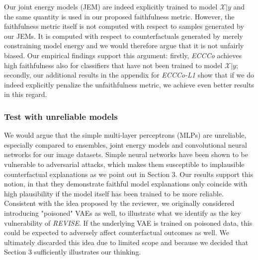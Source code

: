 \documentclass[letterpaper]{article} %
\begin{document}
Our joint energy models (JEM) are indeed explicitly trained to model $\mathcal{X}|y$ and the same quantity is used in our proposed faithfulness metric. However, the faithfulness metric itself is not computed with respect to samples generated by our JEMs. It is computed with respect to counterfactuals generated by merely constraining model energy and we would therefore argue that it is not unfairly biased. Our empirical findings support this argument: firstly, \textit{ECCCo} achieves high faithfulness also for classifiers that have not been trained to model $\mathcal{X}|y$; secondly, our additional results in the appendix for \textit{ECCCo-L1} show that if we do indeed explicitly penalize the unfaithfulness metric, we achieve even better results in this regard. 

\subsubsection{Test with unreliable models}

We would argue that the simple multi-layer perceptrons (MLPs) are unreliable, especially compared to ensembles, joint energy models and convolutional neural networks for our image datasets. Simple neural networks have been shown to be vulnerable to adversarial attacks, which makes them susceptible to implausible counterfactual explanations as we point out in Section 3. Our results support this notion, in that they demonstrate faithful model explanations only coincide with high plausibility if the model itself has been trained to be more reliable. Consistent with the idea proposed by the reviewer, we originally considered introducing "poisoned" VAEs as well, to illustrate what we identify as the key vulnerability of \textit{REVISE}. If the underlying VAE is trained on poisoned data, this could be expected to adversely affect counterfactual outcomes as well. We ultimately discarded this idea due to limited scope and because we decided that Section 3 sufficiently illustrates our thinking. 

\FloatBarrier


\end{document}
